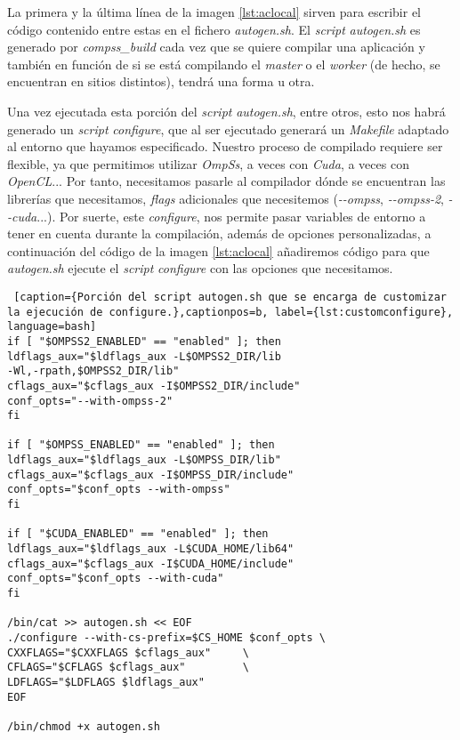 \par\bigskip

La primera y la última línea de la imagen \ref{lst:aclocal} sirven para escribir el código contenido entre estas en el fichero \textit{autogen.sh}. El \textit{script} \textit{autogen.sh} es generado por \textit{compss\_build} cada vez que se quiere compilar una aplicación y también en función de si se está compilando el \textit{master} o el \textit{worker} (de hecho, se encuentran en sitios distintos), tendrá una forma u otra. 
\par\smallskip

Una vez ejecutada esta porción del \textit{script} \textit{autogen.sh}, entre otros, esto nos habrá generado un \textit{script} \textit{configure}, que al ser ejecutado generará un \textit{Makefile} adaptado al entorno que hayamos especificado. Nuestro proceso de compilado requiere ser flexible, ya que permitimos utilizar \textit{OmpSs}, a veces con \textit{Cuda}, a veces con \textit{OpenCL}... Por tanto, necesitamos pasarle al compilador dónde se encuentran las librerías que necesitamos, \textit{flags} adicionales que necesitemos (\textit{-{}-ompss}, \textit{-{}-ompss-2}, \textit{-{}-cuda}...). Por suerte, este \textit{configure}, nos permite pasar variables de entorno a tener en cuenta durante la compilación, además de opciones personalizadas, a continuación del código de la imagen \ref{lst:aclocal} añadiremos código para que \textit{autogen.sh} ejecute el \textit{script} \textit{configure} con las opciones que necesitamos.
\bigskip

\begin{minipage}{\linewidth}
\begin{lstlisting} [caption={Porción del script autogen.sh que se encarga de customizar la ejecución de configure.},captionpos=b, label={lst:customconfigure}, language=bash]                                                                                                                                               
if [ "$OMPSS2_ENABLED" == "enabled" ]; then
ldflags_aux="$ldflags_aux -L$OMPSS2_DIR/lib
-Wl,-rpath,$OMPSS2_DIR/lib"
cflags_aux="$cflags_aux -I$OMPSS2_DIR/include"
conf_opts="--with-ompss-2"
fi

if [ "$OMPSS_ENABLED" == "enabled" ]; then
ldflags_aux="$ldflags_aux -L$OMPSS_DIR/lib"
cflags_aux="$cflags_aux -I$OMPSS_DIR/include"
conf_opts="$conf_opts --with-ompss"
fi

if [ "$CUDA_ENABLED" == "enabled" ]; then
ldflags_aux="$ldflags_aux -L$CUDA_HOME/lib64"
cflags_aux="$cflags_aux -I$CUDA_HOME/include"
conf_opts="$conf_opts --with-cuda"
fi

/bin/cat >> autogen.sh << EOF
./configure --with-cs-prefix=$CS_HOME $conf_opts \ 
CXXFLAGS="$CXXFLAGS $cflags_aux"     \  
CFLAGS="$CFLAGS $cflags_aux"         \
LDFLAGS="$LDFLAGS $ldflags_aux" 
EOF

/bin/chmod +x autogen.sh
\end{lstlisting}
\end{minipage}

